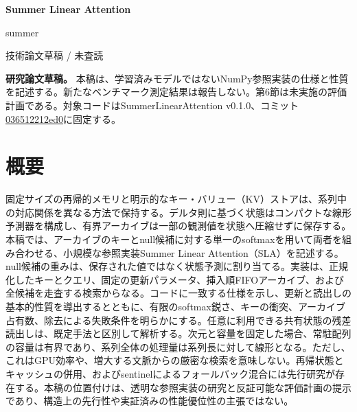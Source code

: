 \documentclass[11pt,a4paper]{article}
\begin{document}
\thispagestyle{plain}
\begin{center}
{\fontsize{19}{27}\selectfont\bfseries Summer Linear Attention\par}
\vspace{5pt}{\large デルタ状態と有界KV検索を組み合わせたメモリの参照実装研究\par}
\vspace{10pt}
{\normalsize summer\par}
\vspace{3pt}{\small 2026年10月24日\par}
\vspace{5pt}
{\small\sffamily\color{Muted} 技術論文草稿 / 未査読\par}
\end{center}
\vspace{3pt}
\textbf{研究論文草稿。} 本稿は、学習済みモデルではないNumPy参照実装の仕様と性質を記述する。新たなベンチマーク測定結果は報告しない。第6節は未実施の評価計画である。対象コードはSummerLinearAttention v0.1.0、コミット\href{https://github.com/Summer110622/SummerLinearAttention/tree/036512212ed0f7d2456988cb4b523599064a7e6f}{036512212ed0}に固定する。

\section{概要}\label{ux6982ux8981}

固定サイズの再帰的メモリと明示的なキー・バリュー（KV）ストアは、系列中の対応関係を異なる方法で保持する。デルタ則に基づく状態はコンパクトな線形予測器を構成し、有界アーカイブは一部の観測値を状態へ圧縮せずに保存する。本稿では、アーカイブのキーとnull候補に対する単一のsoftmaxを用いて両者を組み合わせる、小規模な参照実装Summer Linear Attention（SLA）を記述する。null候補の重みは、保存された値ではなく状態予測に割り当てる。実装は、正規化したキーとクエリ、固定の更新パラメータ、挿入順FIFOアーカイブ、および全候補を走査する検索からなる。コードに一致する仕様を示し、更新と読出しの基本的性質を導出するとともに、有限のsoftmax鋭さ、キーの衝突、アーカイブ占有数、除去による失敗条件を明らかにする。任意に利用できる共有状態の残差読出しは、既定手法と区別して解析する。次元と容量を固定した場合、常駐配列の容量は有界であり、系列全体の処理量は系列長に対して線形となる。ただし、これはGPU効率や、増大する文脈からの厳密な検索を意味しない。再帰状態とキャッシュの併用、およびsentinelによるフォールバック混合には先行研究が存在する。本稿の位置付けは、透明な参照実装の研究と反証可能な評価計画の提示であり、構造上の先行性や実証済みの性能優位性の主張ではない。
\end{document}
